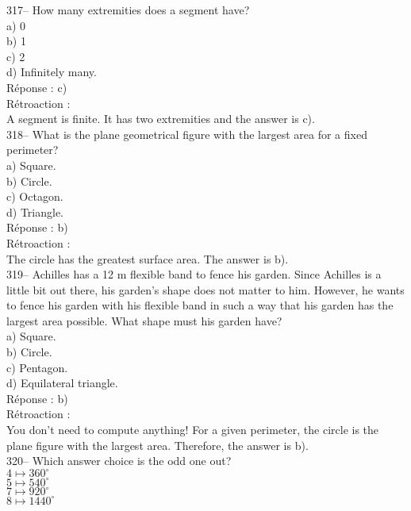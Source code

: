 \documentclass[letterpaper, 12pt]{article}
\begin{document}
317-- How many extremities does a segment have?\\

a) 0\\
b) 1\\
c) 2\\
d) Infinitely many.\\

R\'eponse : c)\\

R\'etroaction : \\
A segment is finite. It has two extremities and the answer is c).\\

318-- What is the plane geometrical figure with the largest area for a fixed perimeter?\\

a) Square.\\
b) Circle.\\
c) Octagon.\\
d) Triangle.\\

R\'eponse : b)\\

R\'etroaction :\\
The circle has the greatest surface area. The answer is b).\\

319-- Achilles has a 12 m flexible band to fence his garden. Since Achilles is a little bit out there, his garden's shape does not matter to him. However, he wants to fence his garden with his flexible band in such a way that his garden has the largest area possible. What shape must his garden have?\\

a) Square.\\
b) Circle.\\
c) Pentagon.\\
d) Equilateral triangle.\\

R\'eponse : b)\\

R\'etroaction : \\
You don't need to compute anything! For a given perimeter, the circle is the plane figure with the largest area. Therefore, the answer is b).\\


320-- Which answer choice is the odd one out?\\

$4\longmapsto 360^{\circ}$\\
$5\longmapsto 540^{\circ}$\\
$7\longmapsto 920^{\circ}$\\
$8\longmapsto 1440^{\circ}$\\
\end{document}
